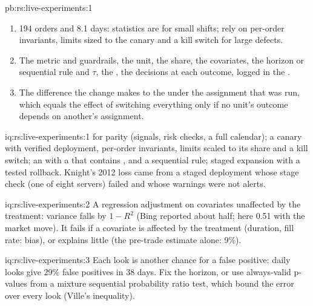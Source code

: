 \begin{solution}{pb:rs:live-experiments:1}
\begin{enumerate}
guardrails on fill rate and mark-outs, and a rollback path at each stage; and ask whether a 0.08 saving is worth the change.
\item 194 orders and 8.1 days: statistics are for small shifts; rely on per-order invariants, limits sized to the canary and a kill switch for large defects.
\item The metric and guardrails, the unit, the share, the covariates, the horizon or sequential rule and $\tau$, the , the decisions at
each outcome, logged in the .
\item The difference the change makes to the  under the assignment that was run, which equals the effect of switching everything only if
no unit's outcome depends on another's assignment.
\end{enumerate}
\end{solution}

\begin{solution}{iq:rs:live-experiments:1}
 for parity (signals, risk checks, a full calendar); a canary with verified deployment, per-order invariants, limits scaled to its share and a
kill switch; an  with a  that contains ,  and a sequential rule; staged expansion with a tested rollback. Knight's
2012 loss came from a staged deployment whose stage check (one of eight servers) failed and whose warnings were not alerts.
\end{solution}

\begin{solution}{iq:rs:live-experiments:2}
A regression adjustment on covariates unaffected by the treatment: variance falls by $1 - R^2$ (Bing reported about half; here 0.51 with the market move).
It fails if a covariate is affected by the treatment (duration, fill rate: bias), or explains little (the pre-trade estimate alone: 9\%).
\end{solution}

\begin{solution}{iq:rs:live-experiments:3}
Each look is another chance for a false positive: daily looks give 29\% false positives in 38 days. Fix the horizon, or use always-valid p-values from a
mixture sequential probability ratio test, which bound the error over every look (Ville's inequality).
\end{solution}

